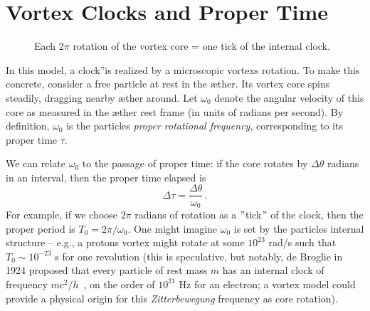 \section{Vortex Clocks and Proper Time}

\begin{figure}[H]
    \centering
    \caption{Each $2\pi$ rotation of the vortex core = one tick of the internal clock.}
    \label{fig:wervelklok}
\end{figure}

In this model, a \grqq clock\textquotedblright is realized by a microscopic vortex\rqs s rotation. To make this concrete, consider a free particle at rest in the æther. Its vortex core spins steadily, dragging nearby æther around. Let $\omega_0$ denote the angular velocity of this core as measured in the æther rest frame (in units of radians per second). By definition, $\omega_0$ is the particle\rqs s \emph{proper rotational frequency}, corresponding to its proper time $\tau$.

We can relate $\omega_0$ to the passage of proper time: if the core rotates by $\Delta \theta$ radians in an interval, then the proper time elapsed is
\[
\Delta \tau = \frac{\Delta \theta}{\omega_0} \,.
\]
For example, if we choose $2\pi$ radians of rotation as a \("\)tick\("\) of the clock, then the proper period is $T_0 = 2\pi/\omega_0$. One might imagine $\omega_0$ is set by the particle\rqs s internal structure – e.g., a proton\rqs s vortex might rotate at some $10^{23}$ rad/s such that $T_0 \sim 10^{-23}$ s for one revolution (this is speculative, but notably, de Broglie in 1924 proposed that every particle of rest mass $m$ has an internal clock of frequency $mc^2/h$~\cite{deBroglie1924-frequency}, on the order of $10^{21}$ Hz for an electron; a vortex model could provide a physical origin for this \emph{Zitterbewegung} frequency as core rotation).

